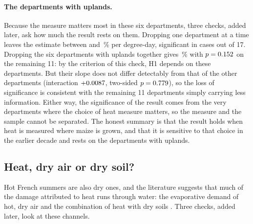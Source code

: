 \paragraph{The departments with uplands.} Because the measure matters most in these six departments, three checks, added later, ask how much the result rests on them. Dropping one department at a time leaves the estimate between \LooMinPct{} and \LooMaxPct\,\% per degree-day, significant in \LooSig{} cases out of 17. Dropping the six departments with uplands together gives \NoReliefPct\,\% with $p = 0.152$ on the remaining 11: by the criterion of this check, H1 depends on these departments. But their slope does not differ detectably from that of the other departments (interaction $+0.0087$, two-sided $p = 0.779$), so the loss of significance is consistent with the remaining 11 departments simply carrying less information. Either way, the significance of the result comes from the very departments where the choice of heat measure matters, so the measure and the sample cannot be separated. The honest summary is that the result holds when heat is measured where maize is grown, and that it is sensitive to that choice in the earlier decade and rests on the departments with uplands.


\subsection{Heat, dry air or dry soil?}
\label{subsec:maize-vpd}

Hot French summers are also dry ones, and the literature suggests that much of the damage attributed to heat runs through water: the evaporative demand of hot, dry air \parencite{lobell2013} and the combination of heat with dry soils \parencite{haqiqi2021,lesk2022}. Three checks, added later, look at these channels.

